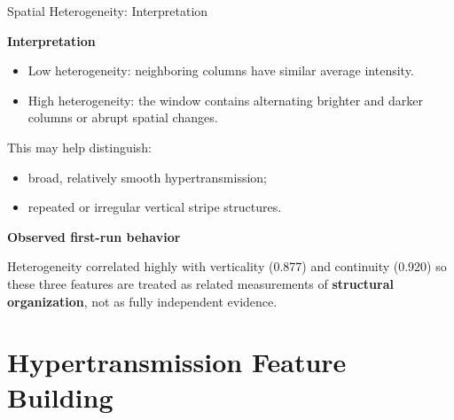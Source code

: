 \documentclass[aspectratio=169]{beamer}
\begin{document}
\begin{frame}{Spatial Heterogeneity: Interpretation}

\textbf{Interpretation}

\begin{itemize}
    \item Low heterogeneity: neighboring columns have similar average
    intensity.
    \item High heterogeneity: the window contains alternating brighter and
    darker columns or abrupt spatial changes.
\end{itemize}

This may help distinguish:

\begin{itemize}
    \item broad, relatively smooth hypertransmission;
    \item repeated or irregular vertical stripe structures.
\end{itemize}

\vspace{0.3cm}

\textbf{Observed first-run behavior}

Heterogeneity correlated highly with verticality (0.877) and continuity (0.920) so these three features are treated as related measurements of
\textbf{structural organization}, not as fully independent evidence.

\end{frame}


\section{Hypertransmission Feature Building}
\end{document}
